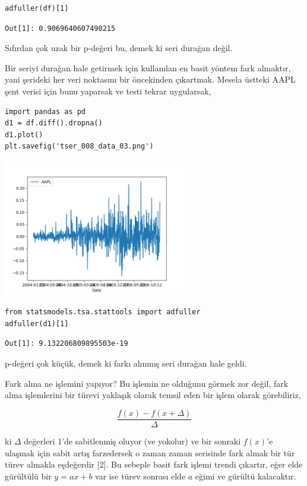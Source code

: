 \documentclass[12pt,fleqn]{article}\usepackage{../../common}
\begin{document}
\begin{verbatim}
adfuller(df)[1]
\end{verbatim}

\begin{verbatim}
Out[1]: 0.9069640607490215
\end{verbatim}

Sıfırdan çok uzak bir p-değeri bu, demek ki seri durağan değil.

Bir seriyi durağan hale getirmek için kullanılan en basit yöntem fark
almaktır, yani şerideki her veri noktasını bir öncekinden çıkartmak. Mesela
üstteki AAPL şent verisi için bunu yaparsak ve testi tekrar uygularsak,

\begin{verbatim}
import pandas as pd
d1 = df.diff().dropna()
d1.plot()
plt.savefig('tser_008_data_03.png')
\end{verbatim}

\includegraphics[height=6cm]{tser_008_data_03.png}

\begin{verbatim}
from statsmodels.tsa.stattools import adfuller
adfuller(d1)[1]
\end{verbatim}

\begin{verbatim}
Out[1]: 9.132206809895503e-19
\end{verbatim}

p-değeri çok küçük, demek ki farkı alınmış seri durağan hale geldi.

Fark alma ne işlemini yapıyor? Bu işlemin ne olduğunu görmek zor değil, fark
alma işlemlerini bir türevi yaklaşık olarak temsil eden bir işlem olarak
görebiliriz, 

$$
\frac{f(x)-f(x+\Delta)}{\Delta}
$$

ki $\Delta$ değerleri 1'de sabitlenmiş oluyor (ve yokolur) ve bir sonraki
$f(x)$'e ulaşmak için sabit artış farzedersek o zaman zaman serisinde fark almak
bir tür türev almakla eşdeğerdir [2]. Bu sebeple basit fark işlemi trendi
çıkartır, eğer elde gürültülü bir $y = ax + b$ var ise türev sonrası elde $a$
eğimi ve gürültü kalacaktır.
\end{document}
